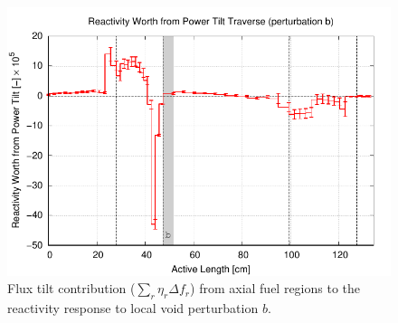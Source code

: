 \documentclass[11pt]{article}
\begin{document}
\clearpage
\begin{figure}[p]
  \centering
  \includegraphics[width=\textwidth, trim=0 0 0 0.275in, clip]{./img/AC-TraverseEtaDeltaEff.pdf}
  \caption{Flux tilt contribution ($\sum_r{\eta_r \Delta f_r}$) from axial fuel regions to the reactivity response to local void perturbation $b$.}
  \label{fig:tiltAc}
\end{figure}
\end{document}
